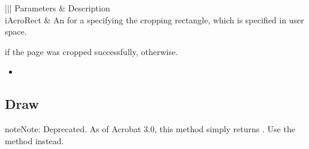 \documentclass[letterpaper,12pt,english,openany,oneside]{sphinxmanual}
\begin{document}

\begin{sphinxVerbatim}[commandchars=\\\{\}]
  
\end{sphinxVerbatim}
\label{\detokenize{IAC_API_OLE_Objects:parameters-72}}


\begin{savenotes}\sphinxattablestart
\centering
{}\label{\detokenize{IAC_API_OLE_Objects:section-81}}\nobreak
\begin{tabular}[t]{|||}
\hline
\sphinxstyletheadfamily 
Parameters
&\sphinxstyletheadfamily 
Description
\\
\hline
iAcroRect
&
An  for a  specifying the cropping rectangle, which is specified in user space.
\\
\hline
\end{tabular}
\par
\sphinxattableend\end{savenotes}


 if the page was cropped successfully,  otherwise.

\label{\detokenize{IAC_API_OLE_Objects:related-methods-117}}
\begin{itemize}
\item {} 
 

\end{itemize}




\subsection{Draw}
\label{\detokenize{IAC_API_OLE_Objects:draw}}
\begin{sphinxadmonition}{note}{Note:}
Deprecated. As of Acrobat 3.0, this method simply returns . Use the method   instead.
\end{sphinxadmonition}
\end{document}
